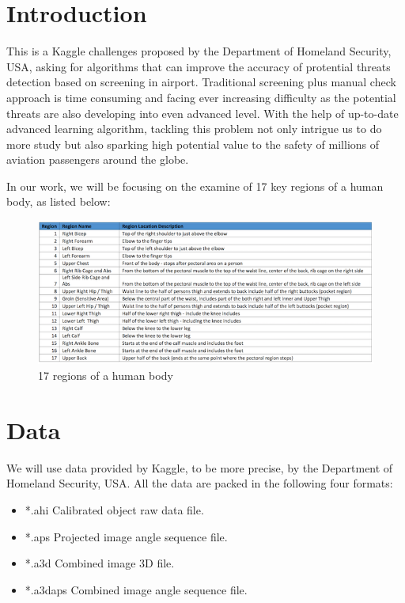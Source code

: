 \documentclass[conference,compsoc]{IEEEtran}
\begin{document}
\section{Introduction}
	\par
	This is a Kaggle challenges proposed by the Department of Homeland Security, USA, asking for algorithms that can improve the accuracy of protential threats detection based on screening in airport. Traditional screening plus manual check approach is time consuming and facing ever increasing difficulty as the potential threats are also developing into even advanced level. With the help of up-to-date advanced learning algorithm, tackling this problem not only intrigue us to do more study but also sparking high potential value to the safety of millions of aviation passengers around the globe.
	\par
	In our work, we will be focusing on the examine of 17 key regions of a human body, as listed below:
	\begin{figure}[h]
		\includegraphics[scale=0.35]{Pic/body_zones.png}
		\caption{17 regions of a human body}
	\end{figure}
\section{Data}
	We will use data provided by Kaggle, to be more precise, by the Department of Homeland Security, USA. All the data are packed in the following four formats:
	\begin{itemize}
		\item{*.ahi} Calibrated object raw data file.
		\item{*.aps} Projected image angle sequence file.
		\item{*.a3d} Combined image 3D file.
		\item{*.a3daps} Combined image angle sequence file.
	\end{itemize}
\end{document}

